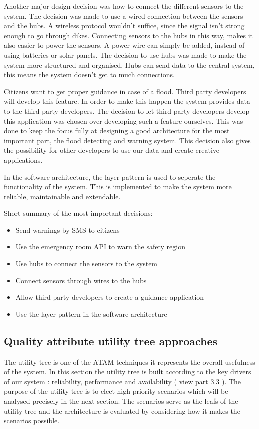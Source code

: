 Another major design decision was how to connect the different sensors to the system. The decision was made to use a wired connection between the sensors and the hubs. A wireless protocol wouldn't suffice, since the signal isn't strong enough to go through dikes. Connecting sensors to the hubs in this way, makes it also easier to power the sensors. A power wire can simply be added, instead of using batteries or solar panels. The decision to use hubs was made to make the system more structured and organised. Hubs can send data to the central system, this means the system doesn't get to much connections. 

Citizens want to get proper guidance in case of a flood. Third party developers will develop this feature. In order to make this happen the system provides data to the third party developers. The decision to let third party developers develop this application was chosen over developing such a feature ourselves. This was done to keep the focus fully at designing a good architecture for the most important part, the flood detecting and warning system. This decision also gives the possibility for other developers to use our data and create creative applications. 

In the software architecture, the layer pattern is used to seperate the functionality of the system. This is implemented to make the system more reliable, maintainable and extendable.

Short summary of the most important decisions:
\begin{itemize}
	\item Send warnings by SMS to citizens
	\item Use the emergency room API to warn the safety region
	\item Use hubs to connect the sensors to the system
	\item Connect sensors through wires to the hubs
	\item Allow third party developers to create a guidance application
	\item Use the layer pattern in the software architecture
\end{itemize}


\subsection{Quality attribute utility tree approaches}
The utility tree is one of the ATAM techniques it represents the overall usefulness of the system. 
In this section the utility tree is built according to the key drivers of our system : reliability, performance and availability ( view part 3.3 ). The purpose of the utility tree is to elect high priority scenarios which will be analysed precisely in the next section.
The scenarios serve as the leafs of the utility tree and the architecture is evaluated by considering how it makes the scenarios possible. \\


